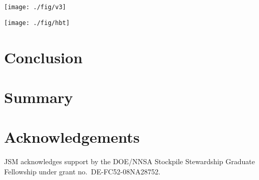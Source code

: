 \documentclass[aps,prc,reprint,amsmath,nofootinbib,superscriptaddress]{revtex4-1}
\begin{document}
\begin{figure*}[t]
  \texttt{[image: ./fig/v3]}
  \caption{
    \label{fig:spectra}
  }
\end{figure*}

\begin{figure*}[t]
  \texttt{[image: ./fig/hbt]}
  \caption{
    \label{fig:spectra}
  }
\end{figure*}

\section{Conclusion}

\section{Summary}

\section{Acknowledgements}

\medskip
JSM acknowledges support by the DOE/NNSA Stockpile Stewardship Graduate Fellowship under grant no.~DE-FC52-08NA28752.


\end{document}
